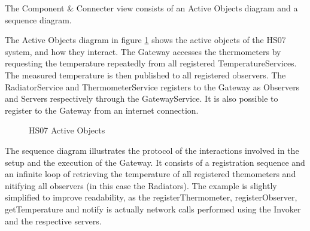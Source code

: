 \documentclass[a4paper,10pt]{article}
\begin{document}
The Component \& Connecter view consists of an Active Objects diagram and a
sequence diagram.

The Active Objects diagram in figure \ref{fig:cc_ao} shows the active objects
of the HS07 system, and how they interact. The Gateway accesses the thermometers
by requesting the temperature repeatedly from all registered TemperatureServices.
The measured temperature is then published to all registered observers. The
RadiatorService and ThermometerService registers to the Gateway as Observers and
Servers respectively through the GatewayService. It is also possible to register
to the Gateway from an internet connection.

\begin{figure}[!htb]
\caption{HS07 Active Objects}
\label{fig:cc_ao}
\end{figure}
The sequence diagram illustrates the protocol of the interactions involved in the setup and the execution of the Gateway. It consists of a registration sequence and an infinite loop of retrieving the temperature of all registered themometers and nitifying all observers (in this case the Radiators). The example is slightly simplified to improve readability, as the registerThermometer, registerObserver, getTemperature and notify is actually network calls performed using the Invoker and the respective servers.
\end{document}
